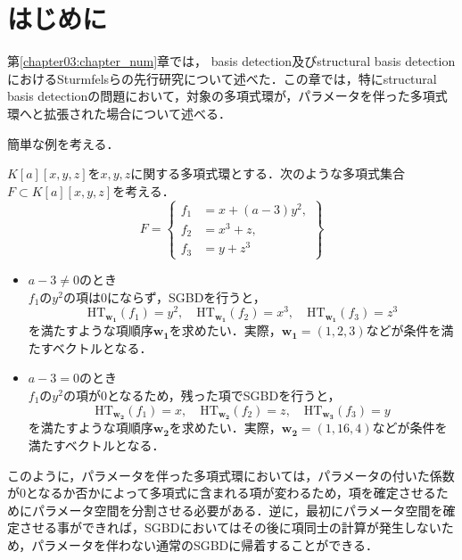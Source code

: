 \section{はじめに}
第\ref{chapter03:chapter_num}章では，\groebner{} basis detection及びstructural \groebner{} basis detectionにおけるSturmfelsらの先行研究について述べた．この章では，特にstructural \groebner{} basis detectionの問題において，対象の多項式環が，パラメータを伴った多項式環へと拡張された場合について述べる．
\par
簡単な例を考える．
\begin{example}
	\label{chapter04:example:PD_example}
	$K[a][x, y, z]$を$x, y, z$に関する多項式環とする．次のような多項式集合$F\subset K[a][x, y, z]$を考える．
	\begin{equation}
		F = \left\{
			\begin{aligned}
				f_1 &= x + (a-3)y^2, \\
				f_2 &= x^3 + z, \\
				f_3 &= y + z^3
			\end{aligned}
		\right\}
	\end{equation}
	\begin{itemize}
		\item $a - 3 \ne 0$のとき\\
			$f_1$の$y^2$の項は$0$にならず，SGBDを行うと，$$\mathrm{HT}_{\bm{w_1}}(f_1) = y^2, \quad \mathrm{HT}_{\bm{w_1}}(f_2) = x^3,\quad \mathrm{HT}_{\bm{w_1}}(f_3) = z^3$$を満たすような項順序$\bm{w_1}$を求めたい．実際，$\bm{w_1}=(1, 2, 3)$などが条件を満たすベクトルとなる．
		\item $a - 3 = 0$のとき\\
			$f_1$の$y^2$の項が$0$となるため，残った項でSGBDを行うと，$$\mathrm{HT}_{\bm{w_2}}(f_1) = x,\quad \mathrm{HT}_{\bm{w_2}}(f_2) = z,\quad \mathrm{HT}_{\bm{w_3}}(f_3) = y$$を満たすような項順序$\bm{w_2}$を求めたい．実際，$\bm{w_2} = (1, 16, 4)$などが条件を満たすベクトルとなる．
	\end{itemize}
\end{example}
このように，パラメータを伴った多項式環においては，パラメータの付いた係数が$0$となるか否かによって多項式に含まれる項が変わるため，項を確定させるためにパラメータ空間を分割させる必要がある．逆に，最初にパラメータ空間を確定させる事ができれば，SGBDにおいてはその後に項同士の計算が発生しないため，パラメータを伴わない通常のSGBDに帰着することができる．












